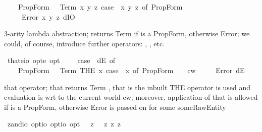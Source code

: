 \begin{isabellebody}
\ \ \ \ PropForm\ {\isasymphi}\ {\isasymRightarrow}\ Term\ {\isacharparenleft}{\isasymlambda}x\ y\ z{\isachardot}\ case\ {\isacharparenleft}{\isasymPhi}\ x\ y\ z{\isacharparenright}\ of\ PropForm\ {\isasymphi}\ {\isasymRightarrow}\ {\isasymphi}{\isacharparenright}\isanewline
\ \ {\isacharbar}\ {\isacharunderscore}\ {\isasymRightarrow}\ Error\ {\isacharparenleft}{\isasymlambda}x\ y\ z{\isachardot}\ dIO{\isacharparenright}{\isachardoublequoteclose}%
\begin{isamarkuptext}%
3-arity lambda abstraction;  returns Term  if \isa{{\isasymphi}} is a PropForm, 
otherwise Error; we could, of course, introduce further operators: , , etc.%
\end{isamarkuptext}%
\isamarkuptrue%
\isamarkupfalse%
\ that{\isacharcolon}{\isacharcolon}{\isachardoublequoteopen}{\isacharparenleft}e{\isasymRightarrow}io\ opt{\isacharparenright}{\isasymRightarrow}e\ opt{\isachardoublequoteclose}\ \ {\isachardoublequoteopen}{\isasymepsilon}\ {\isasymPhi}\ {\isasymequiv}\ case\ {\isacharparenleft}{\isasymPhi}\ dE{\isacharparenright}\ of\isanewline
\ \ \ \ PropForm\ {\isasymphi}\ {\isasymRightarrow}\ Term\ {\isacharparenleft}THE\ x{\isachardot}\ case\ {\isacharparenleft}{\isasymPhi}\ x{\isacharparenright}\ of\ PropForm\ {\isasympsi}\ {\isasymRightarrow}\ {\isasympsi}\ cw{\isacharparenright}\isanewline
\ \ {\isacharbar}\ {\isacharunderscore}\ {\isasymRightarrow}\ Error\ dE{\isachardoublequoteclose}%
\begin{isamarkuptext}%
that operator; that  returns Term , that is the inbuilt THE 
operator is used and evaluation is wrt to the current world cw; moreover, application of that 
is allowed if  is a PropForm, otherwise Error is passed on for some someRawEntity%
\end{isamarkuptext}%
\isamarkuptrue%
%
\isamarkuptrue%
\isamarkupfalse%
\ z{\isacharunderscore}and{\isacharcolon}{\isacharcolon}{\isachardoublequoteopen}io\ opt{\isasymRightarrow}io\ opt{\isasymRightarrow}io\ opt{\isachardoublequoteclose}\ \ {\isachardoublequoteopen}{\isasymphi}\ {\isasymand}\isactrlsup z\ {\isasympsi}\ {\isasymequiv}\ {\isasymnot}\isactrlsup z{\isacharparenleft}{\isasymphi}\ {\isasymrightarrow}\isactrlsup z\ {\isasymnot}\isactrlsup z{\isasympsi}{\isacharparenright}{\isachardoublequoteclose}\isanewline

\end{isabellebody}
